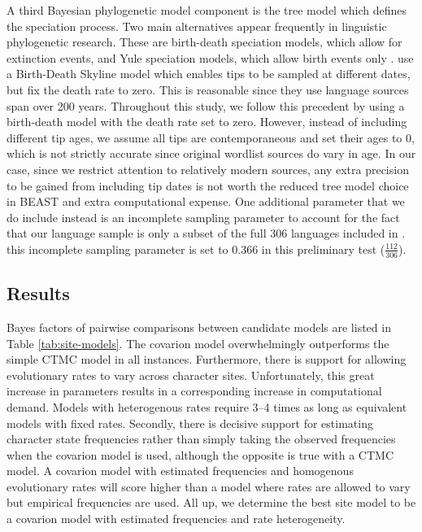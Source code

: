 \documentclass[]{article}
\begin{document}
A third Bayesian phylogenetic model component is the tree model which defines the speciation process. Two main alternatives appear frequently in linguistic phylogenetic research. These are birth-death speciation models, which allow for extinction events, and Yule speciation models, which allow birth events only \autocites[as preferred in][]{bowern_computational_2012}{kolipakam_bayesian_2018}. \textcite{bouckaert_origin_2018} use a Birth-Death Skyline model which enables tips to be sampled at different dates, but fix the death rate to zero. This is reasonable since they use language sources span over 200 years. Throughout this study, we follow this precedent by using a birth-death model with the death rate set to zero. However, instead of including different tip ages, we assume all tips are contemporaneous and set their ages to 0, which is not strictly accurate since original wordlist sources do vary in age. In our case, since we restrict attention to relatively modern sources, any extra precision to be gained from including tip dates is not worth the reduced tree model choice in BEAST and extra computational expense. One additional parameter that we do include instead is an incomplete sampling parameter to account for the fact that our language sample is only a subset of the full 306 languages included in \textcite{bouckaert_origin_2018}. this incomplete sampling parameter is set to 0.366 in this preliminary test (\(\frac{112}{306}\)).

\hypertarget{results-prelim-1}{%
\subsection{Results}\label{results-prelim-1}}

Bayes factors of pairwise comparisons between candidate models are listed in Table \ref{tab:site-models}. The covarion model overwhelmingly outperforms the simple CTMC model in all instances. Furthermore, there is support for allowing evolutionary rates to vary across character sites. Unfortunately, this great increase in parameters results in a corresponding increase in computational demand. Models with heterogenous rates require 3--4 times as long as equivalent models with fixed rates. Secondly, there is decisive support for estimating character state frequencies rather than simply taking the observed frequencies when the covarion model is used, although the opposite is true with a CTMC model. A covarion model with estimated frequencies and homogenous evolutionary rates will score higher than a model where rates are allowed to vary but empirical frequencies are used. All up, we determine the best site model to be a covarion model with estimated frequencies and rate heterogeneity.
\end{document}

